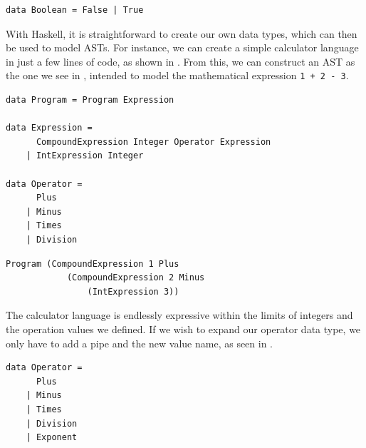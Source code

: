 \begin{lstlisting}[caption={Recreating the Boolean type with Haskell.}, captionpos=b, label={Recreating the Boolean type with Haskell.}]
data Boolean = False | True
\end{lstlisting}

With Haskell, it is straightforward to create our own data types, which can then be used to model ASTs. For instance, we can create a simple calculator language in just a few lines of code, as shown in . From this, we can construct an AST as the one we see in , intended to model the mathematical expression \texttt{1 + 2 - 3}. \\

\begin{lstlisting}[caption={Data types for a calculator language in Haskell.}, captionpos=b, label={Data types for a calculator language in Haskell.}]
data Program = Program Expression

data Expression =
      CompoundExpression Integer Operator Expression
    | IntExpression Integer

data Operator =
      Plus
    | Minus
    | Times
    | Division
\end{lstlisting}

\begin{lstlisting}[caption={An AST constructed with data types presented in \Cref{Data types for a calculator language in Haskell.}}, captionpos=b, label={An AST constructed with data types presented in}]
Program (CompoundExpression 1 Plus
            (CompoundExpression 2 Minus
                (IntExpression 3))
\end{lstlisting}

The calculator language is endlessly expressive within the limits of integers and the operation values we defined. If we wish to expand our operator data type, we only have to add a pipe and the new value name, as seen in . \\

\begin{lstlisting}[caption={An extended version of the Operator data type presented in \Cref{Data types for a calculator language in Haskell.}}, captionpos=b, label={An extended version of the Operator data type presented in}]
data Operator =
      Plus
    | Minus
    | Times
    | Division
    | Exponent
\end{lstlisting}

